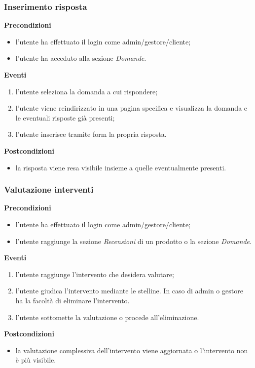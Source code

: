 \documentclass[a4paper, 14pt]{article}
\begin{document}
\begin{flushleft}
			\subsubsection{Inserimento risposta}
			\textbf{Precondizioni}
			\begin{itemize}
				\item l'utente ha effettuato il login come admin/gestore/cliente;
				\item l'utente ha acceduto alla sezione \textit{Domande}.
			\end{itemize}
			\textbf{Eventi}
			\begin{enumerate}
				\item l'utente seleziona la domanda a cui rispondere;
				\item l'utente viene reindirizzato in una pagina specifica e visualizza la domanda e le eventuali risposte già presenti;
				\item l'utente inserisce tramite form la propria risposta.
			\end{enumerate}
			\textbf{Postcondizioni}
			\begin{itemize}
				\item la risposta viene resa visibile insieme a quelle eventualmente presenti.
			\end{itemize}
			
			\bigskip
			\subsubsection{Valutazione interventi}
			\textbf{Precondizioni}
			\begin{itemize}
				\item l'utente ha effettuato il login come admin/gestore/cliente;
				\item l'utente raggiunge la sezione \textit{Recensioni} di un prodotto o la sezione \textit{Domande}.
			\end{itemize}
			\textbf{Eventi}
			\begin{enumerate}
				\item l'utente raggiunge l'intervento che desidera valutare;
				\item l'utente giudica l'intervento mediante le stelline. In caso di admin o gestore ha la facoltà di eliminare l'intervento.
				\item l'utente sottomette la valutazione o procede all'eliminazione.
			\end{enumerate}
			\textbf{Postcondizioni}
			\begin{itemize}
				\item la valutazione complessiva dell'intervento viene aggiornata o l'intervento non è più visibile.
			\end{itemize}
		

\end{flushleft}
\end{document}
